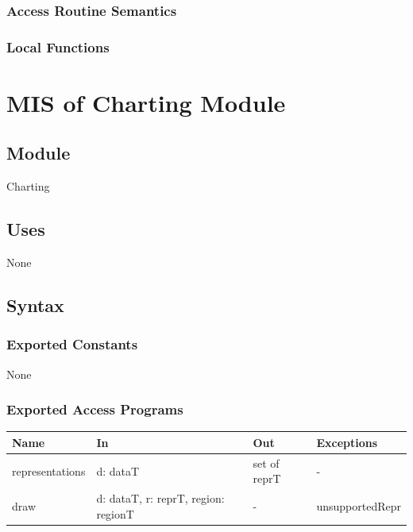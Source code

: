 \documentclass[12pt, titlepage]{article}
\begin{document}
\subsubsection{Access Routine Semantics}

\subsubsection{Local Functions}

\newpage

\section{MIS of Charting Module} \label{mis:Charting}

\subsection{Module}

Charting

\subsection{Uses}

None

\subsection{Syntax}

\subsubsection{Exported Constants}

None

\subsubsection{Exported Access Programs}

\begin{center}
\small
\begin{tabular}{p{3.3cm} p{4.7cm} p{2.6cm} p{2.8cm}}
\hline
\textbf{Name} & \textbf{In} & \textbf{Out} & \textbf{Exceptions} \\
\hline
representations & d: dataT & set of reprT & - \\
draw & d: dataT, r: reprT, region: regionT & - & unsupportedRepr \\
\hline
\end{tabular}
\end{center}
\end{document}
